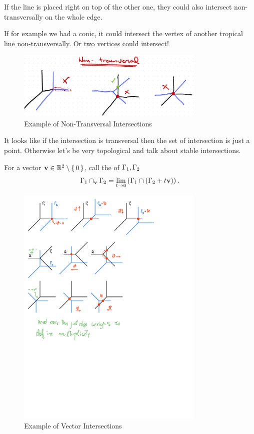 \documentclass[12pt]{memoir}
\begin{document}
\begin{Ex}
    If the line is placed right on top of the other one, they could also intersect non-transversally on the whole edge.\par 
    If for example we had a conic, it could intersect the vertex of another tropical line non-transversally. Or two vertices could intersect!
    \begin{figure}[h!]
        \centering
        \includegraphics[width=0.8\textwidth]{figs/fig11-2-NonTransversalIntersectionExample.png}
        \caption{Example of Non-Transversal Intersections}
        \label{fig:11.2-NonTransversalIntersectionExample}
    \end{figure}
\end{Ex}

It looks like if the intersection is transversal then the set of intersection is just a point. Otherwise let's be very topological and talk about stable intersections.

\begin{Def}
    For a vector $\mathbf{v}\in\mathbb{R}^2\setminus\{\,0\,\}$, call the  of $\Gamma_1,\Gamma_2$
    $$\Gamma_1\cap_{\mathbf{v}}\Gamma_2=\lim_{t\to 0}\left(\Gamma_1\cap(\Gamma_2+t\mathbf{v})\right).$$
\end{Def}

\begin{figure}[h!]
    \centering
    \includegraphics[width=0.8\textwidth, trim= 0.1cm 23.25cm 5cm 0.25cm,clip]{figs/fig11-3-4-and-5-VectorIntersections.pdf}
    \caption{Example of Vector Intersections}
    \label{fig:11.3-VectorIntersection1}
\end{figure} 
\end{document}
